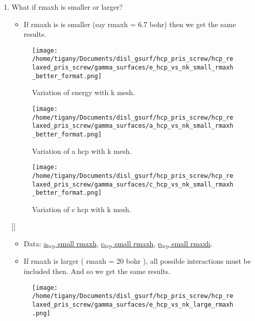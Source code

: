 \documentclass[11pt]{article}
\begin{document}
\begin{enumerate}
\begin{enumerate}
\item What if rmaxh is smaller or larger?
\label{sec:orgc2cc590}
\begin{itemize}
\item If rmaxh is is smaller (say rmaxh = 6.7 bohr) then we get the same
results.
\end{itemize}
\begin{figure}[htbp]
\centering
\texttt{[image: /home/tigany/Documents/disl\_gsurf/hcp\_pris\_screw/hcp\_relaxed\_pris\_screw/gamma\_surfaces/e\_hcp\_vs\_nk\_small\_rmaxh\_better\_format.png]}
\caption{\label{fig:org1a0d309}
Variation of energy with k mesh.}
\end{figure}
\begin{figure}[htbp]
\centering
\texttt{[image: /home/tigany/Documents/disl\_gsurf/hcp\_pris\_screw/hcp\_relaxed\_pris\_screw/gamma\_surfaces/a\_hcp\_vs\_nk\_small\_rmaxh\_better\_format.png]}
\caption{\label{fig:org9ccaf5a}
Variation of a hcp with k mesh.}
\end{figure}
\begin{figure}[htbp]
\centering
\texttt{[image: /home/tigany/Documents/disl\_gsurf/hcp\_pris\_screw/hcp\_relaxed\_pris\_screw/gamma\_surfaces/c\_hcp\_vs\_nk\_small\_rmaxh\_better\_format.png]}
\caption{\label{fig:org6159d3e}
Variation of c hcp with k mesh.}
\end{figure}]]
\begin{itemize}
\item Data: \href{file:///home/tigany/Documents/disl\_gsurf/hcp\_pris\_screw/hcp\_relaxed\_pris\_screw/gamma\_surfaces/a\_hcp\_vs\_nk\_rmaxh\_small.pkl}{a\(_{\text{hcp}}\) small rmaxh}, \href{file:///home/tigany/Documents/disl\_gsurf/hcp\_pris\_screw/hcp\_relaxed\_pris\_screw/gamma\_surfaces/c\_hcp\_vs\_nk\_rmaxh\_small.pkl}{c\(_{\text{hcp}}\) small rmaxh}, \href{file:///home/tigany/Documents/disl\_gsurf/hcp\_pris\_screw/hcp\_relaxed\_pris\_screw/gamma\_surfaces/e\_hcp\_vs\_nk\_rmaxh\_small.pkl}{e\(_{\text{hcp}}\) small rmaxh}.
\end{itemize}
\begin{itemize}
\item If rmaxh is larger ( rmaxh = 20 bohr ), all possible interactions must
be included then. And so we get the same results.
\end{itemize}
\begin{figure}[htbp]
\centering
\texttt{[image: /home/tigany/Documents/disl\_gsurf/hcp\_pris\_screw/hcp\_relaxed\_pris\_screw/gamma\_surfaces/e\_hcp\_vs\_nk\_large\_rmaxh.png]}

\end{figure}
\end{enumerate}
\end{enumerate}
\end{document}
